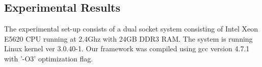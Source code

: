 


\subsection{Experimental Results}
\label{sec:results-1}

The experimental set-up consists of a dual socket system consisting of
Intel Xeon E5620 CPU running at 2.4Ghz with 24GB DDR3 RAM. The system
is running Linux kernel ver 3.0.40-1. Our framework was compiled
using gcc version 4.7.1 with '-O3' optimization flag.


